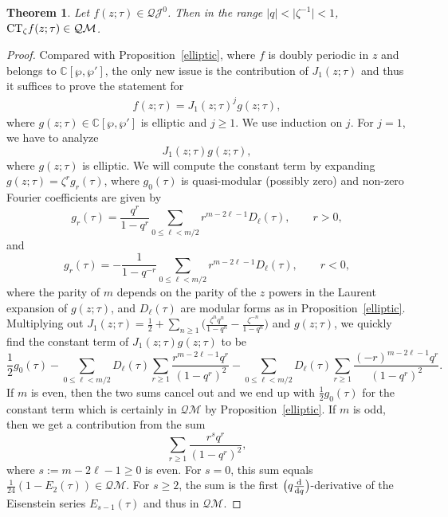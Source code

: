 \documentclass[10pt,a4paper]{amsart}
\numberwithin{equation}{section}
\newtheorem{Theorem}{Theorem}[section]
\theoremstyle{definition}
\begin{document}
\begin{Theorem} \label{quasi} Let $f(z;\tau) \in \mathcal{QJ}^0$. Then in the range $|q|<\bigl|\zeta^{-1}\bigr|<1$, ${\rm CT}_\zeta f(z;\tau) \in \mathcal{QM}$.
\end{Theorem}
\begin{proof}
Compared with Proposition~\ref{elliptic}, where $f$ is doubly periodic in $z$ and belongs to $\mathbb{C}[\wp,\wp']$, the only new issue is the contribution of $J_1(z;\tau)$ and thus it suffices to prove the statement for
\begin{align*}
f(z;\tau)=J_1(z;\tau)^j g(z;\tau),
\end{align*}
where $g(z;\tau) \in \mathbb{C}[\wp,\wp']$ is elliptic and $j \geq 1$.
We use induction on $j$. For $j=1$, we have to
analyze
\[
J_1(z;\tau) g(z;\tau),
\]
where $g(z;\tau)$ is elliptic. We will compute the constant term by expanding $g(z;\tau)=\zeta^r g_r(\tau)$, where $g_0(\tau)$ is quasi-modular (possibly zero) and
non-zero Fourier coefficients are given by~\cite{BFM}
\[
g_r(\tau)=\frac{q^{r}}{1-q^r} \sum_{0 \leq \ell < m/2} r^{m-2\ell-1} D_{\ell}(\tau), \qquad r>0,
\]
and
\[
g_r(\tau)=-\frac{1}{1-q^{-r}} \sum_{0 \leq \ell < m/2} r^{m-2\ell-1} D_{\ell}(\tau), \qquad r<0,
\]
where the parity of $m$ depends on the parity of the $z$ powers in the Laurent expansion of $g(z;\tau)$, and $D_{\ell}(\tau)$ are modular forms as in Proposition~\ref{elliptic}.
Multiplying out $J_1(z;\tau)=\frac12+\sum_{n \geq 1} \bigl(\frac{\zeta^n q^n}{1-q^n}-\frac{\zeta^{-n}}{1-q^n} \bigr)$ and $g(z;\tau)$, we quickly find the constant term of $J_1(z;\tau) g(z;\tau)$ to be
\[
\frac{1}{2}g_0(\tau)- \sum_{0 \leq \ell < m/2} D_\ell(\tau) \sum_{r \geq 1} \frac{ r^{m-2\ell-1} q^r}{(1-q^r)^2} - \sum_{0 \leq \ell < m/2} D_\ell(\tau) \sum_{r \geq 1} \frac{ (-r)^{m-2\ell-1} q^r}{(1-q^r)^2}.
\]
If $m$ is even, then the two sums cancel out and we end up with $\frac12 g_0(\tau)$ for the constant term which is certainly in $\mathcal{QM}$ by Proposition~\ref{elliptic}. If $m$ is odd, then we get a contribution from the sum
\[
\sum_{r \geq 1} \frac{ r^{s} q^r}{(1-q^r)^2},
\]
where $s:=m- 2\ell -1 \geq 0$ is even. For $s=0$, this sum equals $\frac{1}{24}(1-E_2(\tau)) \in \mathcal{QM}$. For $s \geq 2$, the sum is the first $\bigl(q \frac{{\rm d}}{{\rm d}q}\bigr)$-derivative of
the Eisenstein series $E_{s-1}(\tau)$ and thus in $\mathcal{QM}$.


\end{proof}
\end{document}
